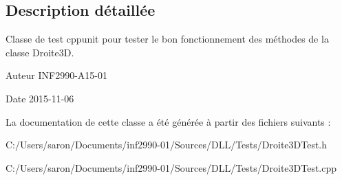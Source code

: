 \subsection{Description détaillée}
Classe de test cppunit pour tester le bon fonctionnement des méthodes de la classe Droite3\-D. 

\begin{DoxyAuthor}{Auteur}
I\-N\-F2990-\/\-A15-\/01 
\end{DoxyAuthor}
\begin{DoxyDate}{Date}
2015-\/11-\/06 
\end{DoxyDate}


La documentation de cette classe a été générée à partir des fichiers suivants \-:\begin{DoxyCompactItemize}
\item 
C\-:/\-Users/saron/\-Documents/inf2990-\/01/\-Sources/\-D\-L\-L/\-Tests/Droite3\-D\-Test.\-h\item 
C\-:/\-Users/saron/\-Documents/inf2990-\/01/\-Sources/\-D\-L\-L/\-Tests/Droite3\-D\-Test.\-cpp\end{DoxyCompactItemize}
